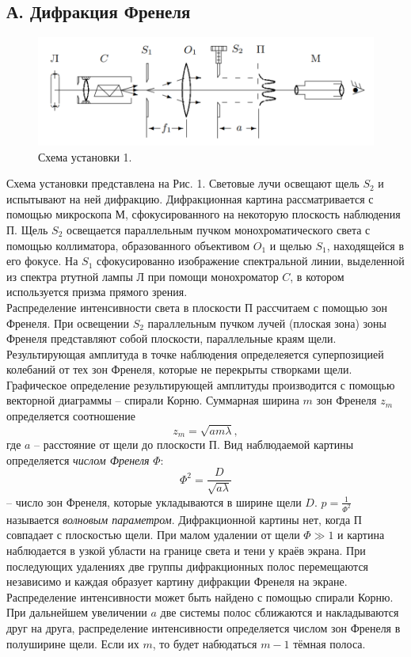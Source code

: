 \subsection*{А. Дифракция Френеля}
\begin{figure}[h]
\includegraphics[scale=0.7]{0.png}
\centering
\caption{Схема установки 1.}
\end{figure}
Схема установки представлена на Рис. 1. Световые лучи освещают щель $S_2$ и испытывают на ней дифракцию. Дифракционная картина рассматривается с помощью микроскопа М, сфокусированного на некоторую плоскость наблюдения П. Щель $S_2$ освещается параллельным пучком монохроматического света с помощью коллиматора, образованного объективом $O_1$ и щелью $S_1$, находящейся в его фокусе. На $S_1$ сфокусированно изображение спектральной линии, выделенной из спектра ртутной лампы Л при помощи монохроматор $C$, в котором используется призма прямого зрения. \\
Распределение интенсивности света в плоскости П рассчитаем с помощью зон Френеля. При освещении $S_2$ параллельным пучком лучей (плоская зона) зоны Френеля представляют собой плоскости, параллельные краям щели. Результирующая амплитуда в точке наблюдения определеяется суперпозицией колебаний от тех зон Френеля, которые не перекрыты створками щели. Графическое определение результирующей амплитуды производится с помощью векторной диаграммы -- спирали Корню. Суммарная ширина $m$ зон Френеля $z_m$ определяется соотношение
\begin{equation}
z_m = \sqrt{am\lambda},
\end{equation}
где $a$ -- расстояние от щели до плоскости П. Вид наблюдаемой картины определяется \textit{числом Френеля} $\Phi$:
$$
\Phi^2 = \dfrac{D}{\sqrt{a\lambda}}
$$
-- число зон Френеля, которые укладываются в ширине щели $D$. $p = \frac{1}{\Phi^2}$ называется \textit{волновым параметром}. Дифракционной картины нет, когда П совпадает с плоскостью щели. При малом удалении от щели $\Phi \gg 1$ и картина наблюдается в узкой убласти на границе света и тени у краёв экрана. При последующих удалениях две группы дифракционных полос перемещаются независимо и каждая образует картину дифракции Френеля на экране. Распределение интенсивности может быть найдено с помощью спирали Корню. При дальнейшем увеличении $a$ две системы полос сближаются и накладываются друг на друга, распределение интенсивности определяется числом зон Френеля в полуширине щели. Если их $m$, то будет набюдаться $m-1$ тёмная полоса.
